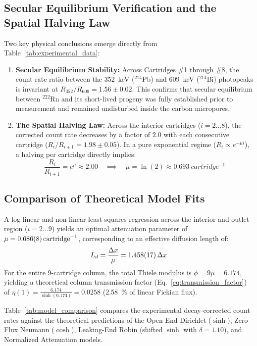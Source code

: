 \documentclass[11pt,a4paper]{article}
\begin{document}
\subsection{Secular Equilibrium Verification and the Spatial Halving Law}
Two key physical conclusions emerge directly from Table~\ref{tab:experimental_data}:
\begin{enumerate}
    \item \textbf{Secular Equilibrium Stability:} Across Cartridges \#1 through \#8, the count rate ratio between the \SI{352}{keV} ($^{214}\text{Pb}$) and \SI{609}{keV} ($^{214}\text{Bi}$) photopeaks is invariant at $R_{352}/R_{609} = 1.56 \pm 0.02$. This confirms that secular equilibrium between $^{222}\text{Rn}$ and its short-lived progeny was fully established prior to measurement and remained undisturbed inside the carbon micropores.
    \item \textbf{The Spatial Halving Law:} Across the interior cartridges ($i = 2 \dots 8$), the corrected count rate decreases by a factor of $2.0$ with each consecutive cartridge ($R_i / R_{i+1} = 1.98 \pm 0.05$). In a pure exponential regime ($R_i \propto e^{-\mu i}$), a halving per cartridge directly implies:
    \begin{equation}
        \frac{R_i}{R_{i+1}} = e^{\mu} \approx 2.00 \quad \implies \quad \mu = \ln(2) \approx \SI{0.693}{cartridge^{-1}}
    \end{equation}
\end{enumerate}

\subsection{Comparison of Theoretical Model Fits}
A log-linear and non-linear least-squares regression across the interior and outlet region ($i = 2 \dots 9$) yields an optimal attenuation parameter of $\mu = \SI{0.686 \pm 0.008}{cartridge^{-1}}$, corresponding to an effective diffusion length of:
\begin{equation}
    L_d = \frac{\Delta x}{\mu} = \num{1.458 \pm 0.017}\,\Delta x
\end{equation}
For the entire 9-cartridge column, the total Thiele modulus is $\phi = 9\mu = 6.174$, yielding a theoretical column transmission factor (Eq.~\ref{eq:transmission_factor}) of $\eta(1) = \frac{6.174}{\sinh(6.174)} = \num{0.0258}$ (\SI{2.58}{\percent} of linear Fickian flux).

Table~\ref{tab:model_comparison} compares the experimental decay-corrected count rates against the theoretical predictions of the Open-End Dirichlet ($\sinh$), Zero-Flux Neumann ($\cosh$), Leaking-End Robin (shifted $\sinh$ with $\delta = 1.10$), and Normalized Attenuation models.
\end{document}
